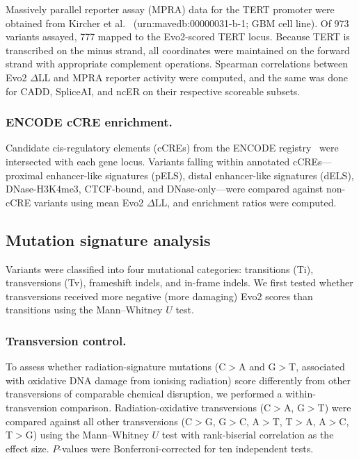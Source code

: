 Massively parallel reporter assay (MPRA) data for the TERT promoter were
obtained from Kircher et al.~\cite{TERT_MPRA_2019}
(urn:mavedb:00000031-b-1; GBM cell line). Of 973 variants assayed, 777 mapped
to the Evo2-scored TERT locus. Because TERT is transcribed on the minus strand,
all coordinates were maintained on the forward strand with appropriate complement
operations. Spearman correlations between Evo2 $\Delta$LL and MPRA reporter
activity were computed, and the same was done for CADD, SpliceAI, and ncER on
their respective scoreable subsets.

\subsubsection*{ENCODE cCRE enrichment.}

Candidate cis-regulatory elements (cCREs) from the ENCODE
registry~\cite{ENCODE_2020} were intersected with each gene locus. Variants
falling within annotated cCREs---proximal enhancer-like signatures (pELS), distal
enhancer-like signatures (dELS), DNase-H3K4me3, CTCF-bound, and
DNase-only---were compared against non-cCRE variants using mean Evo2 $\Delta$LL,
and enrichment ratios were computed.

\subsection{Mutation signature analysis}
\label{sec:methods_radiation}

Variants were classified into four mutational categories: transitions (Ti),
transversions (Tv), frameshift indels, and in-frame indels. We first tested
whether transversions received more negative (more damaging) Evo2 scores than
transitions using the Mann--Whitney $U$ test.

\subsubsection*{Transversion control.}

To assess whether radiation-signature mutations (C$>$A and G$>$T, associated
with oxidative DNA damage from ionising radiation) score differently from other
transversions of comparable chemical disruption, we performed a
within-transversion comparison. Radiation-oxidative transversions (C$>$A, G$>$T)
were compared against all other transversions (C$>$G, G$>$C, A$>$T, T$>$A,
A$>$C, T$>$G) using the Mann--Whitney $U$ test with rank-biserial correlation as
the effect size. $P$-values were Bonferroni-corrected for ten independent tests.

